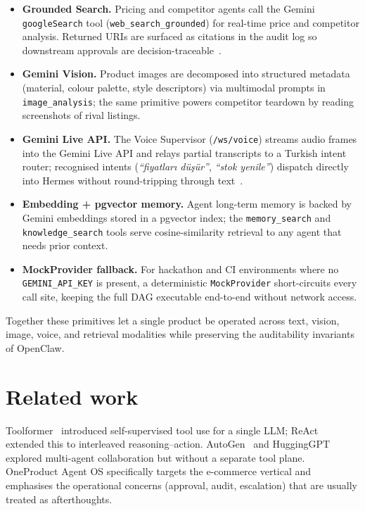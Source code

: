 \documentclass[11pt,a4paper]{article}
\begin{document}
\begin{itemize}
  \item \textbf{Grounded Search.} Pricing and competitor agents call the
    Gemini \texttt{googleSearch} tool (\texttt{web\_search\_grounded}) for
    real-time price and competitor analysis. Returned URIs are surfaced as
    citations in the audit log so downstream approvals are
    decision-traceable~\cite{gemini_grounding2024}.
  \item \textbf{Gemini Vision.} Product images are decomposed into
    structured metadata (material, colour palette, style descriptors) via
    multimodal prompts in \texttt{image\_analysis}; the same primitive
    powers competitor teardown by reading screenshots of rival listings.
  \item \textbf{Gemini Live API.} The Voice Supervisor
    (\texttt{/ws/voice}) streams audio frames into the Gemini Live API and
    relays partial transcripts to a Turkish intent router; recognised
    intents (\emph{``fiyatları düşür''}, \emph{``stok yenile''}) dispatch
    directly into Hermes without round-tripping through
    text~\cite{gemini_live2024}.
  \item \textbf{Embedding + pgvector memory.} Agent long-term memory is
    backed by Gemini embeddings stored in a pgvector index; the
    \texttt{memory\_search} and \texttt{knowledge\_search} tools serve
    cosine-similarity retrieval to any agent that needs prior context.
  \item \textbf{MockProvider fallback.} For hackathon and CI environments
    where no \texttt{GEMINI\_API\_KEY} is present, a deterministic
    \texttt{MockProvider} short-circuits every call site, keeping the full
    DAG executable end-to-end without network access.
\end{itemize}

Together these primitives let a single product be operated across text,
vision, image, voice, and retrieval modalities while preserving the
auditability invariants of OpenClaw.

\section{Related work}

Toolformer~\cite{schick2023toolformer} introduced self-supervised tool use for a
single LLM; ReAct~\cite{yao2023react} extended this to interleaved
reasoning--action. AutoGen~\cite{wu2023autogen} and
HuggingGPT~\cite{shen2023hugginggpt} explored multi-agent collaboration but
without a separate tool plane. OneProduct Agent OS specifically targets the
e-commerce vertical and emphasises the operational concerns (approval, audit,
escalation) that are usually treated as afterthoughts.
\end{document}
